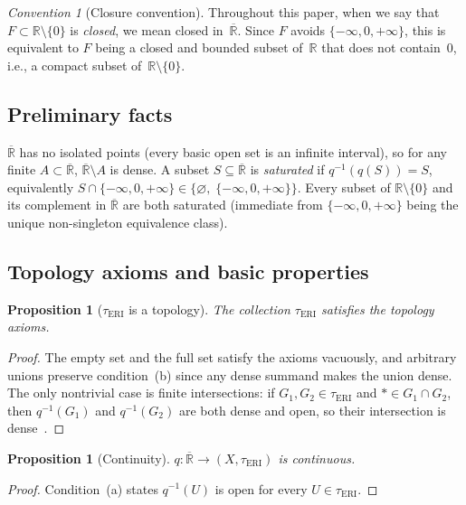 \documentclass[11pt]{article}
\newtheorem{proposition}[theorem]{Proposition}
\theoremstyle{definition}
\theoremstyle{remark}
\newtheorem{convention}[theorem]{Convention}
\begin{document}
\begin{convention}[Closure convention]\label{conv:closed}
Throughout this paper, when we say that $F \subset \mathbb{R}\setminus\{0\}$
is \emph{closed}, we mean closed in~$\overline{\mathbb{R}}$.
Since $F$ avoids $\{-\infty, 0, +\infty\}$, this is equivalent to
$F$ being a closed and bounded subset of~$\mathbb{R}$ that does not
contain~$0$, i.e., a compact subset of~$\mathbb{R}\setminus\{0\}$.
\end{convention}

\subsection{Preliminary facts}

$\overline{\mathbb{R}}$ has no isolated points (every basic open set is
an infinite interval), so for any finite
$A \subset \overline{\mathbb{R}}$, $\overline{\mathbb{R}} \setminus A$
is dense.
A subset $S \subseteq \overline{\mathbb{R}}$ is \emph{saturated}\label{def:saturated}
if $q^{-1}(q(S)) = S$, equivalently
$S \cap \{-\infty,0,+\infty\} \in \{\varnothing,\;\{-\infty,0,+\infty\}\}$.
Every subset of $\mathbb{R}\setminus\{0\}$ and its complement in
$\overline{\mathbb{R}}$ are both saturated (immediate from
$\{-\infty,0,+\infty\}$ being the unique non-singleton equivalence class).

\subsection{Topology axioms and basic properties}

\begin{proposition}[$\tau_{\mathrm{ERI}}$ is a topology]
\label{prop:topology}
The collection $\tau_{\mathrm{ERI}}$ satisfies the topology axioms.
\end{proposition}
\begin{proof}
The empty set and the full set satisfy the axioms vacuously, and
arbitrary unions preserve condition~(b) since any dense summand makes
the union dense.  The only nontrivial case is finite intersections:
if $G_1, G_2 \in \tau_{\mathrm{ERI}}$ and $\ast \in G_1 \cap G_2$, then
$q^{-1}(G_1)$ and $q^{-1}(G_2)$ are both dense and open, so their
intersection is dense~\cite[1.3.5]{bib:engelking}.
\end{proof}

\begin{proposition}[Continuity]\label{prop:cont}
$q: \overline{\mathbb{R}} \to (X, \tau_{\mathrm{ERI}})$ is continuous.
\end{proposition}
\begin{proof}
Condition~(a) states $q^{-1}(U)$ is open for every
$U \in \tau_{\mathrm{ERI}}$.
\end{proof}
\end{document}
